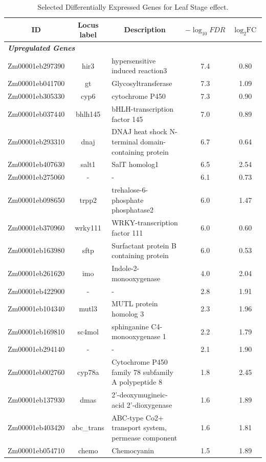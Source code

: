 \documentclass[9pt,twocolumn,twoside]{rilabRxiv}
\begin{document}
\begin{table}[h!]
\centering
\footnotesize %
\caption{Selected Differentially Expressed Genes for Leaf Stage effect.}
\label{table::leafDEGs}
\begin{tabular}{ccp{7.5cm}cc} %
\hline
\textbf{ID} & \textbf{Locus label} & \multicolumn{1}{c}{\textbf{Description}} &   \textbf{$-\log_{10}{\textit{FDR}}$} & \textbf{$\log_2{\text{FC}}$}\\
\hline
\multicolumn{5}{l}{\textit{\textbf{Upregulated Genes}}} \\
\hline
Zm00001eb297390 & hir3 & hypersensitive induced reaction3 & 7.4 & 0.80\\
Zm00001eb041700 & gt & Glycosyltransferase & 7.3 & 1.09\\
Zm00001eb305330 & cyp6 & cytochrome P450 & 7.3 & 0.90\\
Zm00001eb037440 & bhlh145 & bHLH-transcription factor 145 & 7.0 & 0.89\\
Zm00001eb293310 & dnaj & DNAJ heat shock N-terminal domain-containing protein & 6.7 & 0.64\\
Zm00001eb407630 & salt1 & SalT homolog1 & 6.5 & 2.54\\
Zm00001eb275060 & - & - & 6.1 & 0.73\\
Zm00001eb098650 & trpp2 & trehalose-6-phosphate phosphatase2 & 6.0 & 1.47\\
Zm00001eb370960 & wrky111 & WRKY-transcription factor 111 & 6.0 & 0.60\\
Zm00001eb163980 & sftp & Surfactant protein B containing protein & 6.0 & 0.53\\
Zm00001eb261620 & imo & Indole-2-monooxygenase & 4.0 & 2.04\\
Zm00001eb422900 & - & - & 2.8 & 1.91\\
Zm00001eb104340 & mutl3 & MUTL protein homolog 3 & 2.3 & 1.96\\
Zm00001eb169810 & sc4mol & sphinganine C4-monooxygenase 1 & 2.2 & 1.79\\
Zm00001eb294140 & - & - & 2.1 & 1.90\\
Zm00001eb002760 & cyp78a & Cytochrome P450 family 78 subfamily A polypeptide 8 & 1.8 & 2.45\\
Zm00001eb137930 & dmas & 2'-deoxymugineic-acid 2'-dioxygenase & 1.6 & 1.89\\
Zm00001eb403420 & abc\_trans & ABC-type Co2+ transport system, permease component & 1.6 & 1.81\\
Zm00001eb054710 & chemo & Chemocyanin & 1.5 & 1.89\\\hline

\end{tabular}
\end{table}
\end{document}
